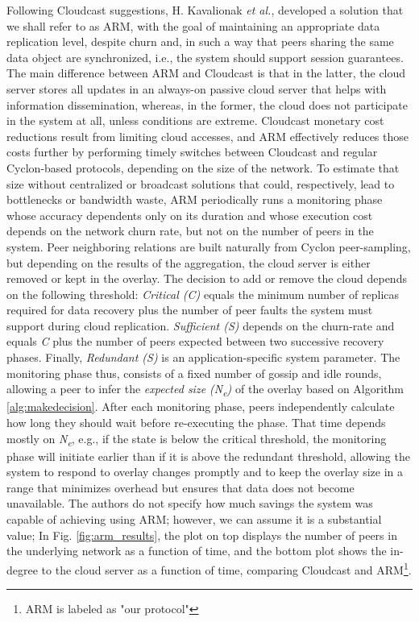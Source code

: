 \documentclass[runningheads]{llncs}
\begin{document}
Following Cloudcast suggestions, H. Kavalionak \textit{et al.}, developed a solution\cite{marriage_of_convinience} that we shall refer to as ARM, with the goal of maintaining an appropriate data replication level, despite churn and, in such a way that peers sharing the same data object are synchronized, i.e., the system should support session guarantees. The main difference between ARM and Cloudcast is that in the latter, the cloud server stores all updates in an always-on passive cloud server that helps with information dissemination, whereas, in the former, the cloud does not participate in the system at all, unless conditions are extreme. Cloudcast monetary cost reductions result from limiting cloud accesses, and ARM effectively reduces those costs further by performing timely switches between Cloudcast and regular Cyclon-based protocols, depending on the size of the network. To estimate that size without centralized or broadcast solutions that could, respectively, lead to bottlenecks or bandwidth waste, ARM periodically runs a monitoring phase whose accuracy dependents only on its duration and whose execution cost depends on the network churn rate, but not on the number of peers in the system. Peer neighboring relations are built naturally from Cyclon peer-sampling, but depending on the results of the aggregation, the cloud server is either removed or kept in the overlay. The decision to add or remove the cloud depends on the following threshold: \textit{Critical (C)} equals the minimum number of replicas required for data recovery plus the number of peer faults the system must support during cloud replication. \textit{Sufficient (S)} depends on the churn-rate and equals \textit{C} plus the number of peers expected between two successive recovery phases. Finally, \textit{Redundant (S)} is an application-specific system parameter. The monitoring phase thus, consists of a fixed number of gossip and idle rounds, allowing a peer to infer the \textit{expected size (N\textsubscript{e})} of the overlay based on Algorithm \ref{alg:makedecision}. After each monitoring phase, peers independently calculate how long they should wait before re-executing the phase. That time depends mostly on \textit{N\textsubscript{e}}, e.g., if the state is below the critical threshold, the monitoring phase will initiate earlier than if it is above the redundant threshold, allowing the system to respond to overlay changes promptly and to keep the overlay size in a range that minimizes overhead but ensures that data does not become unavailable. The authors do not specify how much savings the system was capable of achieving using ARM; however, we can assume it is a substantial value; In Fig. \ref{fig:arm_results}, the plot on top displays the number of peers in the underlying network as a function of time, and the bottom plot shows the in-degree to the cloud server as a function of time, comparing Cloudcast and ARM\footnote{ARM is labeled as "our protocol"}.
\end{document}

